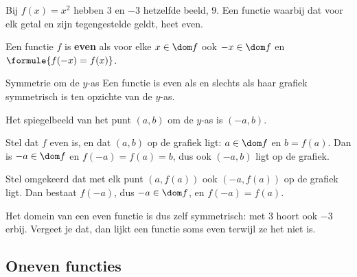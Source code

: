 Bij $f(x) = x^2$ hebben $3$ en $-3$ hetzelfde beeld, $9$. Een functie waarbij dat voor elk getal en zijn tegengestelde geldt, heet even.

\begin{theorie}
Een functie $f$ is \textbf{\textcolor{accent}{even}} als voor elke $x \in \dom f$ ook $-x \in \dom f$ en $\formule{f(-x) = f(x)}$.

\begin{stelling}{Symmetrie om de \mbox{$y$-as}}
Een functie is even als en slechts als haar grafiek symmetrisch is ten opzichte van de \mbox{$y$-as}.
\end{stelling}

\begin{bewijs}
Het spiegelbeeld van het punt $(a, b)$ om de $y$-as is $(-a, b)$.

Stel dat $f$ even is, en dat $(a, b)$ op de grafiek ligt: $a \in \dom f$ en $b = f(a)$. Dan is $-a \in \dom f$ en $f(-a) = f(a) = b$, dus ook $(-a, b)$ ligt op de grafiek.

Stel omgekeerd dat met elk punt $(a, f(a))$ ook $(-a, f(a))$ op de grafiek ligt. Dan bestaat $f(-a)$, dus $-a \in \dom f$, en $f(-a) = f(a)$.
\end{bewijs}
\end{theorie}

Het domein van een even functie is dus zelf symmetrisch: met $3$ hoort ook $-3$ erbij. Vergeet je dat, dan lijkt een functie soms even terwijl ze het niet is.


\subsection{Oneven functies}

